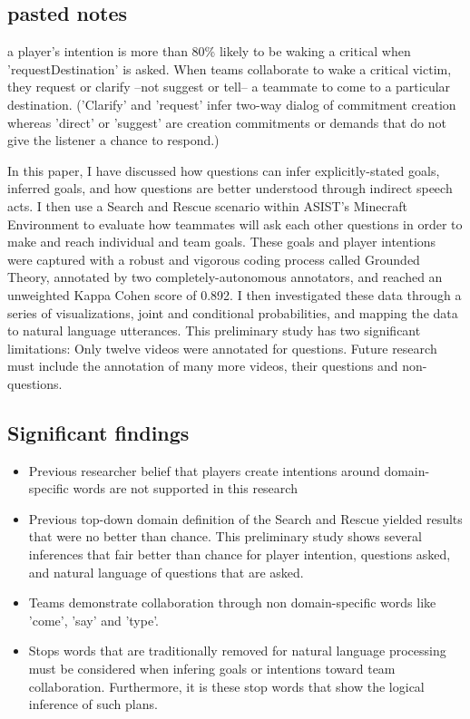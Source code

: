 \subsection{pasted notes}
a player's intention is more than 80\% likely to be waking a critical when 'requestDestination' is asked. When teams collaborate to wake a critical victim, they request or clarify --not suggest or tell-- a teammate to come to a particular destination. ('Clarify' and 'request' infer two-way dialog of commitment creation whereas 'direct' or 'suggest' are creation commitments or demands that do not give the listener a chance to respond.)


\newpage

In this paper, I have discussed how questions can infer explicitly-stated goals, inferred goals, and how questions are better understood through indirect speech acts. I then use a Search and Rescue scenario within ASIST's Minecraft Environment to evaluate how teammates will ask each other questions in order to make and reach individual and team goals. These goals and player intentions were captured with a robust and vigorous coding process called Grounded Theory, annotated by two completely-autonomous annotators, and reached an unweighted Kappa Cohen score of 0.892. I then investigated these data through a series of visualizations, joint and conditional probabilities, and mapping the data to natural language utterances. This preliminary study has two significant limitations: Only twelve videos were annotated for questions. Future research must include the annotation of many more videos, their questions and non-questions. 

\subsection{Significant findings}
\begin{itemize}
    \item Previous researcher belief that players create intentions around domain-specific words are not supported in this research
    \item Previous top-down domain definition of the Search and Rescue yielded results that were no better than chance. This preliminary study shows several inferences that fair better than chance for player intention, questions asked, and natural language of questions that are asked.
    \item Teams demonstrate collaboration through non domain-specific words like 'come', 'say' and 'type'.
    \item Stops words that are traditionally removed for natural language processing must be considered when infering goals or intentions toward team collaboration. Furthermore, it is these stop words that show the logical inference of such plans.
\end{itemize}

